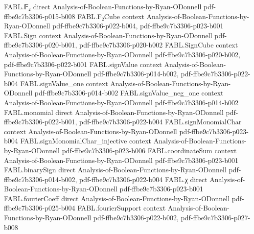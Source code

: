 \begin{theorem}
\label{FABL.semanticPCPPReductionToThreeQueries_proofLength}
\leanok
{}
\proofstep
  {FABL.𝔽₂}
  {direct}
  {Analysis-of-Boolean-Functions-by-Ryan-ODonnell}
  {pdf-ffbe9c7b3306-p015-b008}
\proofstep
  {FABL.F₂Cube}
  {context}
  {Analysis-of-Boolean-Functions-by-Ryan-ODonnell}
  {pdf-ffbe9c7b3306-p022-b004,
    pdf-ffbe9c7b3306-p023-b001}
\proofstep
  {FABL.Sign}
  {context}
  {Analysis-of-Boolean-Functions-by-Ryan-ODonnell}
  {pdf-ffbe9c7b3306-p020-b001,
    pdf-ffbe9c7b3306-p020-b002}
\proofstep
  {FABL.SignCube}
  {context}
  {Analysis-of-Boolean-Functions-by-Ryan-ODonnell}
  {pdf-ffbe9c7b3306-p020-b002,
    pdf-ffbe9c7b3306-p022-b001}
\proofstep
  {FABL.signValue}
  {context}
  {Analysis-of-Boolean-Functions-by-Ryan-ODonnell}
  {pdf-ffbe9c7b3306-p014-b002,
    pdf-ffbe9c7b3306-p022-b004}
\proofstep
  {FABL.signValue_one}
  {context}
  {Analysis-of-Boolean-Functions-by-Ryan-ODonnell}
  {pdf-ffbe9c7b3306-p014-b002}
\proofstep
  {FABL.signValue_neg_one}
  {context}
  {Analysis-of-Boolean-Functions-by-Ryan-ODonnell}
  {pdf-ffbe9c7b3306-p014-b002}
\proofstep
  {FABL.monomial}
  {direct}
  {Analysis-of-Boolean-Functions-by-Ryan-ODonnell}
  {pdf-ffbe9c7b3306-p022-b001,
    pdf-ffbe9c7b3306-p022-b004}
\proofstep
  {FABL.signMonomialChar}
  {context}
  {Analysis-of-Boolean-Functions-by-Ryan-ODonnell}
  {pdf-ffbe9c7b3306-p023-b004}
\proofstep
  {FABL.signMonomialChar_injective}
  {context}
  {Analysis-of-Boolean-Functions-by-Ryan-ODonnell}
  {pdf-ffbe9c7b3306-p023-b006}
\proofstep
  {FABL.coordinateSum}
  {context}
  {Analysis-of-Boolean-Functions-by-Ryan-ODonnell}
  {pdf-ffbe9c7b3306-p023-b001}
\proofstep
  {FABL.binarySign}
  {direct}
  {Analysis-of-Boolean-Functions-by-Ryan-ODonnell}
  {pdf-ffbe9c7b3306-p014-b002,
    pdf-ffbe9c7b3306-p022-b004}
\proofstep
  {FABL.χ}
  {direct}
  {Analysis-of-Boolean-Functions-by-Ryan-ODonnell}
  {pdf-ffbe9c7b3306-p023-b001}
\proofstep
  {FABL.fourierCoeff}
  {direct}
  {Analysis-of-Boolean-Functions-by-Ryan-ODonnell}
  {pdf-ffbe9c7b3306-p025-b004}
\proofstep
  {FABL.fourierSupport}
  {context}
  {Analysis-of-Boolean-Functions-by-Ryan-ODonnell}
  {pdf-ffbe9c7b3306-p022-b002,
    pdf-ffbe9c7b3306-p027-b008}

\end{theorem}
